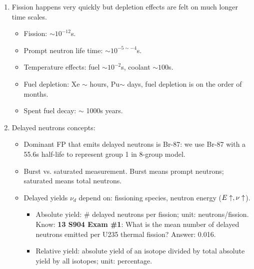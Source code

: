 \documentclass{school-22.211-notes}
\date{May 22, 2012}
\begin{document}
\maketitle


\begin{enumerate}
\item Fission happens very quickly but depletion effects are felt on much longer time scales. 
  \begin{itemize}
    \item Fission: $\sim 10^{-12}$s. 
    \item Prompt neutron life time: $\sim 10^{-5 \sim -4}$s. 
    \item Temperature effects: fuel $\sim 10^{-2}$s, coolant $\sim 100$s. 
    \item Fuel depletion: Xe $\sim$ hours, Pu$\sim$ days, fuel depletion is on the order of months.
    \item Spent fuel decay: $\sim$ 1000s years. 
  \end{itemize}

\item Delayed neutrons concepts: 
  \begin{itemize}
  \item Dominant FP that emits delayed neutrons is Br-87: we use Br-87 with a 55.6s half-life to represent group 1 in 8-group model. 
  \item Burst vs. saturated measurement. Burst means prompt neutrons; saturated means total neutrons. 
  \item Delayed yields $\nu_d$ depend on: fissioning species, neutron energy ($E \uparrow, \nu \uparrow$). 
    \begin{itemize}
    \item Absolute yield: \# delayed neutrons per fission; unit: neutrons/fission. Know:  \textbf{13 S904 Exam \#1}: What is the mean number of delayed neutrons emitted per U235 thermal fission? Answer: 0.016.  
    \item Relative yield: absolute yield of an isotope divided by total absolute yield by all isotopes; unit: percentage. 
    \end{itemize}


\end{itemize}
\end{enumerate}
\end{document}
